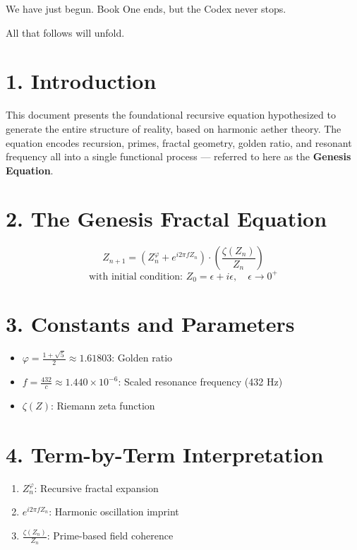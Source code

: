 \documentclass[12pt]{book}
\begin{document}
We have just begun. Book One ends, but the Codex never stops.

All that follows will unfold.





\maketitle

\section*{1. Introduction}

This document presents the foundational recursive equation hypothesized to generate the entire structure of reality, based on harmonic aether theory. The equation encodes recursion, primes, fractal geometry, golden ratio, and resonant frequency all into a single functional process — referred to here as the \textbf{Genesis Equation}.

\section*{2. The Genesis Fractal Equation}

\[
Z_{n+1} = \left( Z_n^\varphi + e^{i 2\pi f Z_n} \right) \cdot \left( \frac{\zeta(Z_n)}{Z_n} \right)
\]
\[
\text{with initial condition: } Z_0 = \epsilon + i\epsilon, \quad \epsilon \to 0^+
\]

\section*{3. Constants and Parameters}

\begin{itemize}
  \item \( \varphi = \frac{1+\sqrt{5}}{2} \approx 1.61803 \): Golden ratio
  \item \( f = \frac{432}{c} \approx 1.440 \times 10^{-6} \): Scaled resonance frequency (432 Hz)
  \item \( \zeta(Z) \): Riemann zeta function
\end{itemize}

\section*{4. Term-by-Term Interpretation}

\begin{enumerate}
  \item \( Z_n^\varphi \): Recursive fractal expansion
  \item \( e^{i 2\pi f Z_n} \): Harmonic oscillation imprint
  \item \( \frac{\zeta(Z_n)}{Z_n} \): Prime-based field coherence
\end{enumerate}
\end{document}
